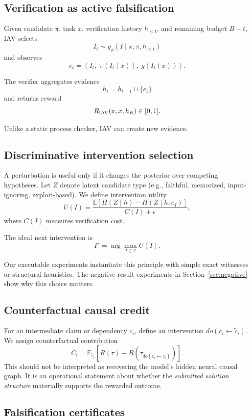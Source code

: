 \documentclass[10pt]{article}
\newcommand{\IAV}{\textsc{IAV}}
\newcommand{\E}{\mathbb{E}}
\begin{document}
\subsection{Verification as active falsification}

Given candidate $\pi$, task $x$, verification history $h_{<t}$, and remaining budget $B-t$, IAV selects
\[
I_t\sim q_\phi(I\mid x,\pi,h_{<t})
\]
and observes
\[
e_t=
\left(
I_t,\;
\pi(I_t(x)),\;
g(I_t(x))
\right).
\]

The verifier aggregates evidence
\[
h_t=h_{t-1}\cup\{e_t\}
\]
and returns reward
\[
R_{\IAV}(\pi,x,h_B)\in[0,1].
\]

Unlike a static process checker, IAV can create new evidence.

\subsection{Discriminative intervention selection}

A perturbation is useful only if it changes the posterior over competing hypotheses. Let $Z$ denote latent candidate type (e.g., faithful, memorized, input-ignoring, exploit-based). We define intervention utility
\[
U(I)
=
\frac{
\E\left[H(Z\mid h)-H(Z\mid h,e_I)\right]
}{
C(I)+\epsilon
},
\]
where $C(I)$ measures verification cost.

The ideal next intervention is
\[
I^\star=\arg\max_{I\in\mathcal{I}}U(I).
\]

Our executable experiments instantiate this principle with simple exact witnesses or structural heuristics. The negative-result experiments in Section~\ref{sec:negative} show why this choice matters.

\subsection{Counterfactual causal credit}

For an intermediate claim or dependency $c_i$, define an intervention $do(c_i\leftarrow \tilde c_i)$. We assign counterfactual contribution
\[
C_i=
\E_{\tilde c_i}
\left[
R(\tau)-R\left(\tau_{do(c_i\leftarrow\tilde c_i)}\right)
\right].
\]
This should not be interpreted as recovering the model's hidden neural causal graph. It is an operational statement about whether the \emph{submitted solution structure} materially supports the rewarded outcome.

\subsection{Falsification certificates}
\end{document}
